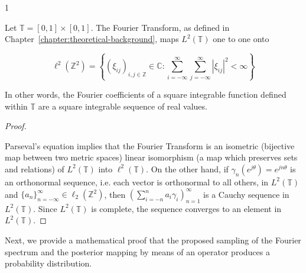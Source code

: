 \begin{corollary}{1 \cite{folland2013real}}
\label{corollary_one}

Let $\mathbb{T} = [0,1] \times [0,1]$. The Fourier Transform, as defined in Chapter~\ref{chapter:theoretical-background}, maps $L^{2}(\mathbb{T})$ one to one onto

\[
    \ell^{2}(\mathbb{Z}^{2}) = 
    \left\{
         (\xi_{ij})_{i,j \in \mathbb{Z}} \in \mathbb{C}: 
        \sum_{i = -\infty}^{\infty}
        \sum_{j = -\infty}^{\infty}
        |\xi_{ij}|^{2} < \infty
    \right\}
\]

\noindent In other words, the Fourier coefficients of a square integrable function defined within $\mathbb{T}$ are a square integrable sequence of real values. 

\begin{proof}{\cite{garling2014course}}

Parseval's equation implies that the Fourier Transform is an isometric (bijective map between two metric spaces) linear isomorphism (a map which preserves sets and relations) of $L^{2}(\mathbb{T})$ into $\ell^{2}(\mathbb{T})$. On the other hand, if $\gamma_{n}(e^{j \theta}) = e^{j n \theta}$ is an orthonormal sequence, i.e. each vector is orthonormal to all others, in $L^{2}(\mathbb{T})$ and $\{a_{n} \}_{n=-\infty}^{\infty} \in \ell_{2}(\mathbb{Z}^{2})$, then $\left( \sum_{i=-n}^{n} a_{i} \gamma_{i} \right)_{n=1}^{\infty}$ is a Cauchy sequence in $L^{2}(\mathbb{T})$. Since $L^{2}(\mathbb{T})$ is complete, the sequence converges to an element in $L^{2}(\mathbb{T})$.
\end{proof}
\end{corollary}
\vspace{0.1in}

Next, we provide a mathematical proof that the proposed sampling of the Fourier spectrum and the posterior mapping by means of an operator produces a probability distribution.

